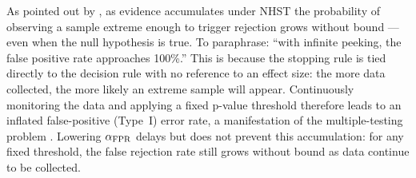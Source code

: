 As pointed out by \citet{kruschke2015doing}, as evidence accumulates under NHST
the probability of observing a sample extreme enough to trigger rejection grows without
bound --- even when the null hypothesis is true. To paraphrase: ``with infinite
peeking, the false positive rate approaches 100\%.'' This is because the stopping
rule is tied directly to the decision rule with no reference to an effect size: the
more data collected, the more likely an extreme sample will appear. Continuously
monitoring the data and applying a fixed p-value threshold therefore leads to an
inflated false-positive (Type~I) error rate, a manifestation of the multiple-testing
problem
\citep{simmons2011}.
Lowering $\alpha_{\rm FPR}$ delays but does not prevent this accumulation: for any
fixed threshold, the false rejection rate still grows without bound as data continue
to be collected.
